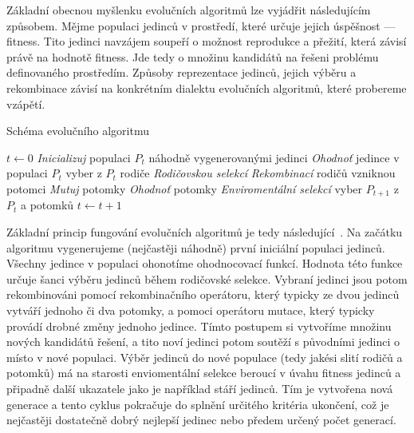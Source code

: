 Základní obecnou myšlenku evolučních algoritmů lze vyjádřit následujícím způsobem. Mějme populaci jedinců v prostředí, které určuje jejich úspěšnost --- fitness. Tito jedinci navzájem soupeří o možnost reprodukce a přežití, která závisí právě na hodnotě fitness. Jde tedy o množinu kandidátů na řešeni problému definovaného prostředím. Způsoby reprezentace jedinců, jejich výběru a rekombinace závisí na konkrétním dialektu evolučních algoritmů, které probereme vzápětí. 

\begin{algorithm}
\caption{Schéma evolučního algoritmu}
\label{obreva}
\begin{algorithmic}
\State $t \gets 0$
\State \emph{Inicializuj} populaci $P_t$ náhodně vygenerovanými jedinci
\State \emph{Ohodnoť} jedince v populaci $P_t$
\State 	vyber z $P_t$ rodiče \emph{Rodičovskou selekcí}
\State 	\emph{Rekombinací} rodičů vzniknou potomci
\State 	\emph{Mutuj} potomky
\State 	\emph{Ohodnoť} potomky
\State 	\emph{Enviromentální selekcí} vyber $P_{t+1}$ z $P_t$ a potomků
\State $t \gets t+1$
\EndWhile
\EndProcedure
\end{algorithmic}
\end{algorithm}


Základní princip fungování evolučních algoritmů je tedy následující~\cite{Eiben:2003}. Na začátku algoritmu vygenerujeme (nejčastěji náhodně) první iniciální populaci jedinců. Všechny jedince v populaci ohonotíme ohodnocovací funkcí. Hodnota této funkce určuje šanci výběru jedinců během rodičovské selekce. Vybraní jedinci jsou potom rekombinováni pomocí rekombinačního operátoru, který typicky ze dvou jedinců vytváří jednoho či dva potomky, a pomoci operátoru mutace, který typicky provádí drobné změny jednoho jedince. Tímto postupem si vytvoříme množinu nových kandidátů řešení, a tito noví jedinci potom soutěží s původními jedinci o místo v nové populaci. Výběr jedinců do nové populace (tedy jakési slití rodičů a potomků) má na starosti enviomentální selekce beroucí v úvahu fitness jedinců a připadně další ukazatele jako je například stáří jedinců. Tím je vytvořena nová generace a tento cyklus pokračuje do splnění určitého kritéria ukončení, což je nejčastěji dostatečně dobrý nejlepší jedinec nebo předem určený počet generací.

